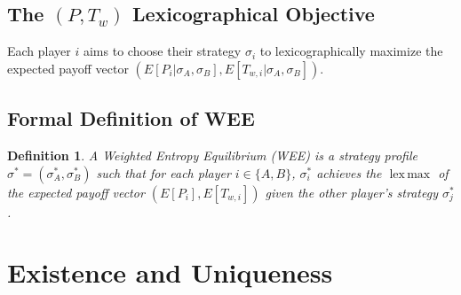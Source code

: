 \documentclass{article}
\newtheorem{definition}[theorem]{Definition}
\DeclareMathOperator*{\lexmax}{lex\,max}
\begin{document}
\subsection{The \texorpdfstring{$(P, T_w)$}{(P, Tw)} Lexicographical Objective}
Each player $i$ aims to choose their strategy $\sigma_i$ to lexicographically maximize the expected payoff vector $(E[P_i | \sigma_A, \sigma_B], E[T_{w,i} | \sigma_A, \sigma_B])$.

\subsection{Formal Definition of WEE}
\begin{definition}
A \emph{Weighted Entropy Equilibrium (WEE)} is a strategy profile $\sigma^* = (\sigma_A^*, \sigma_B^*)$ such that for each player $i \in \{A, B\}$, $\sigma_i^*$ achieves the $\lexmax$ of the expected payoff vector $(E[P_i], E[T_{w,i}])$ given the other player's strategy $\sigma_j^*$.
\end{definition}

\section{Existence and Uniqueness}
\end{document}
